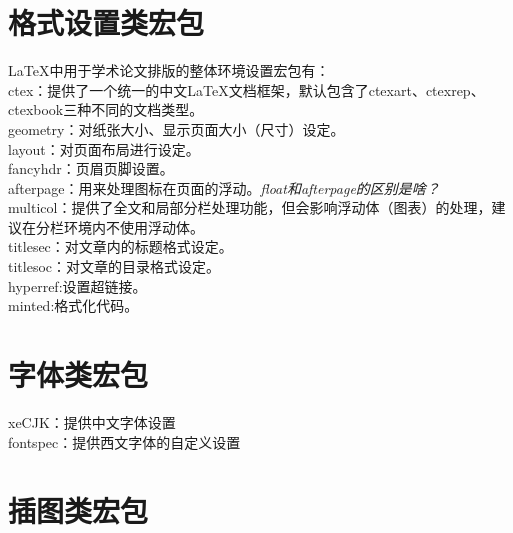\documentclass[12pt]{book}
\begin{document}

\section{格式设置类宏包}

\LaTeX{}中用于学术论文排版的整体环境设置宏包有：\\
ctex：提供了一个统一的中文\LaTeX{}文档框架，默认包含了ctexart、ctexrep、ctexbook三种不同的文档类型。\\
geometry：对纸张大小、显示页面大小（尺寸）设定。\\
layout：对页面布局进行设定。\\
fancyhdr：页眉页脚设置。\\
afterpage：用来处理图标在页面的浮动。\textit{float和afterpage的区别是啥？}\\
multicol：提供了全文和局部分栏处理功能，但会影响浮动体（图表）的处理，建议在分栏环境内不使用浮动体。\\
titlesec：对文章内的标题格式设定。\\
titlesoc：对文章的目录格式设定。\\
hyperref:设置超链接。\\
minted:格式化代码。


\section{字体类宏包}

xeCJK：提供中文字体设置 \\
fontspec：提供西文字体的自定义设置

\section{插图类宏包}
\end{document}

